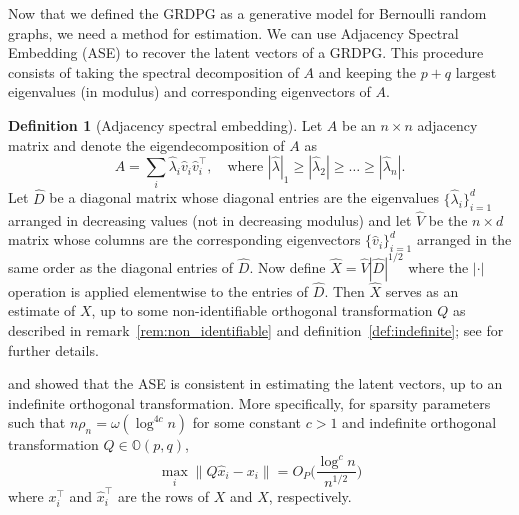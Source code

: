 \documentclass[
  12pt,
]{article}
\theoremstyle{definition}
\newtheorem{definition}{Definition}[section]
\theoremstyle{definition}
\theoremstyle{definition}
\theoremstyle{definition}
\theoremstyle{remark}
\begin{document}
Now that we defined the GRDPG as a generative model for Bernoulli random graphs,
we need a method for estimation.
We can use Adjacency Spectral Embedding (ASE) \citep{doi:10.1080/01621459.2012.699795} to recover the latent vectors of a GRDPG.
This procedure consists of taking the spectral decomposition of \(A\) and keeping the \(p + q\) largest eigenvalues (in modulus) and corresponding eigenvectors of \(A\).

\begin{definition}[Adjacency spectral embedding]
\label{def:ase}
Let $A$ be an $n
\times n$ adjacency matrix and denote the
eigendecomposition of $A$ as
$$A = \sum_{i} \hat{\lambda}_i \hat{v}_i \hat{v}_i^{\top}, \quad
\text{where} \,\,
|\hat{\lambda}|_1 \geq |\hat{\lambda}_2| \geq \dots \geq
|\hat{\lambda}_n|.$$
Let $\hat{D}$ be a diagonal matrix whose diagonal entries are
the eigenvalues $\{\hat{\lambda}_i\}_{i=1}^{d}$ arranged in decreasing values (not in
decreasing modulus) and let $\hat{V}$ be the $n \times d$ matrix whose
columns are the corresponding eigenvectors $\{\hat{v}_i\}_{i=1}^{d}$
arranged in the same order as the diagonal entries of $\hat{D}$. Now
define $\hat{X} = \hat{V} |\hat{D}|^{1/2}$ where the $|\cdot|$
operation is applied elementwise to the entries of $\hat{D}$. Then
$\hat{X}$ serves as an estimate of $X$, up to some non-identifiable
orthogonal transformation $Q$ as described in
remark~\ref{rem:non_identifiable} and definition~\ref{def:indefinite};
see \citet{rubindelanchy2017statistical} for further details.
\end{definition}

\citet{doi:10.1080/01621459.2012.699795} and \citet{rubindelanchy2017statistical} showed that the ASE is consistent in estimating the latent vectors, up to an indefinite orthogonal transformation.
More specifically, for sparsity parameters such that \(n \rho_n = \omega (\log^{4 c} n)\) for some constant \(c > 1\) and indefinite orthogonal transformation \(Q \in \mathbb{O}(p, q)\),
\[\max_i \|Q \hat{x}_i - x_i \| = O_P \bigg( \frac{\log^c n}{n^{1/2}} \bigg)\]
where \(x_i^\top\) and \(\hat{x}_i^\top\) are the rows of \(X\) and \(\hat{X}\), respectively.
\end{document}
